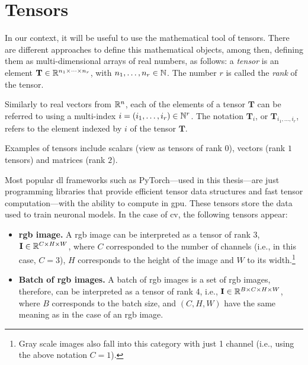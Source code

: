 \section{Tensors}\label{sec:tensor}

In our context, it will be useful to use the mathematical tool of
tensors. There are different approaches to define this mathematical objects,
among then, defining them as multi-dimensional arrays of real numbers, as
follows: a \emph{tensor} is an element
\(\mathbf{T} \in \mathbb{R}^{n_1 \times \cdots \times n_r}\), with
\(n_1, \ldots, n_r \in \mathbb{N}\). The number \(r\) is called the \emph{rank} of the
tensor.

Similarly to real vectors from \(\mathbb{R}^n\), each of the elements of a tensor
\(\mathbf{T}\) can be referred to using a multi-index
\(i = (i_1, \ldots, i_r) \in \mathbb{N}^r\). The notation \(\mathbf{T}_i\), or
\(\mathbf{T}_{i_1, \ldots, i_r}\), refers to the element indexed by \(i\) of
the tensor \(\mathbf{T}\).

\begin{exampleBox}
  Examples of tensors include scalars (view as tensors of rank \(0\)), vectors
  (rank \(1\) tensors) and matrices (rank \(2\)).
\end{exampleBox}

Most popular \gls{dl} frameworks such as PyTorch---used in this thesis---are
just programming libraries that provide efficient tensor data structures and
fast tensor computation---with the ability to compute in \gls{gpu}. These
tensors store the data used to train neuronal models. In the case of \gls{cv},
the following tensors appear:
\begin{itemize}
  \item \textbf{\acs{rgb} image.} A \acs{rgb} image can be interpreted as a
  tensor of rank 3, \(\mathbf{I} \in \mathbb{R}^{C \times H \times W}\), where \(C\)
  corresponded to the number of channels (i.e., in this case, \(C = 3\)), \(H\)
  corresponds to the height of the image and \(W\) to its width.\footnote{Gray
    scale images also fall into this category with just 1 channel (i.e., using
    the above notation \(C = 1\)).}
  \item \textbf{Batch of \acs{rgb} images.} A batch of \acs{rgb} images is a
  set of \acs{rgb} images, therefore, can be interpreted as a tensor of rank 4,
  i.e., \(\mathbf{I} \in \mathbb{R}^{B \times C \times H \times W}\), where \(B\)
  corresponds to the batch size, and \((C, H, W)\) have the same meaning as in
  the case of an \acs{rgb} image.
\end{itemize}


